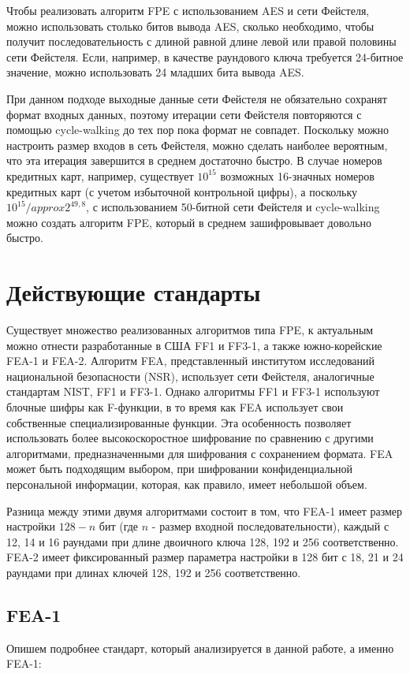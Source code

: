 \documentclass[utf8x, 14pt]{G7-32} %
\begin{document}
Чтобы реализовать алгоритм FPE с использованием AES и сети Фейстеля, можно использовать столько битов вывода AES, сколько необходимо, чтобы получит последовательность с длиной равной длине левой или правой половины сети Фейстеля. Если, например, в качестве раундового ключа требуется 24-битное значение, можно использовать 24 младших бита вывода AES.


При данном подходе выходные данные сети Фейстеля не обязательно сохранят формат входных данных, поэтому итерации сети Фейстеля повторяются с помощью cycle-walking до тех пор пока формат не совпадет. Поскольку можно настроить размер входов в сеть Фейстеля, можно сделать наиболее вероятным, что эта итерация завершится в среднем достаточно быстро. В случае номеров кредитных карт, например, существует $10^{15}$ возможных 16-значных номеров кредитных карт (с учетом избыточной контрольной цифры), а поскольку $10^{15} /approx 2^{49,8}$, с использованием 50-битной сети Фейстеля и cycle-walking можно создать алгоритм FPE, который в среднем зашифровывает довольно быстро.

\section{Действующие стандарты} %
Существует множество реализованных алгоритмов типа FPE, к актуальным можно отнести разработанные в США FF1 и FF3-1, а также южно-корейские FEA-1 и FEA-2.
Алгоритм FEA, представленный институтом исследований национальной безопасности (NSR), использует сети Фейстеля, аналогичные стандартам NIST, FF1 и FF3-1. Однако алгоритмы FF1 и FF3-1 используют блочные шифры как F-функции, в то время как FEA использует свои собственные специализированные функции. Эта особенность позволяет использовать более высокоскоростное шифрование по сравнению с другими алгоритмами, предназначенными для шифрования с сохранением формата. FEA может быть подходящим выбором, при шифровании конфиденциальной персональной информации, которая, как правило, имеет небольшой объем.


Разница между этими двумя алгоритмами состоит в том, что FEA-1 имеет размер настройки $128-n$ бит (где $n$ - размер входной последовательности), каждый с 12, 14 и 16 раундами при длине двоичного ключа 128, 192 и 256 соответственно. FEA-2 имеет фиксированный размер параметра настройки в 128 бит с 18, 21 и 24 раундами при длинах ключей 128, 192 и 256 соответственно.

\subsection{FEA-1}
Опишем подробнее стандарт, который анализируется в данной работе, а именно FEA-1:
\end{document}
